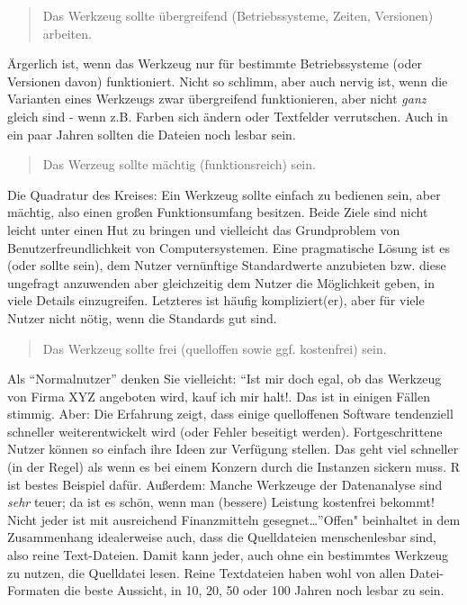\documentclass[12pt,]{book}
\begin{document}
\begin{quote}
Das Werkzeug sollte übergreifend (Betriebssysteme, Zeiten, Versionen)
arbeiten.
\end{quote}

Ärgerlich ist, wenn das Werkzeug nur für bestimmte Betriebssysteme (oder
Versionen davon) funktioniert. Nicht so schlimm, aber auch nervig ist,
wenn die Varianten eines Werkzeugs zwar übergreifend funktionieren, aber
nicht \emph{ganz} gleich sind - wenn z.B. Farben sich ändern oder
Textfelder verrutschen. Auch in ein paar Jahren sollten die Dateien noch
lesbar sein.

\begin{quote}
Das Werzeug sollte mächtig (funktionsreich) sein.
\end{quote}

Die Quadratur des Kreises: Ein Werkzeug sollte einfach zu bedienen sein,
aber mächtig, also einen großen Funktionsumfang besitzen. Beide Ziele
sind nicht leicht unter einen Hut zu bringen und vielleicht das
Grundproblem von Benutzerfreundlichkeit von Computersystemen. Eine
pragmatische Lösung ist es (oder sollte sein), dem Nutzer vernünftige
Standardwerte anzubieten bzw. diese ungefragt anzuwenden aber
gleichzeitig dem Nutzer die Möglichkeit geben, in viele Details
einzugreifen. Letzteres ist häufig kompliziert(er), aber für viele
Nutzer nicht nötig, wenn die Standards gut sind.

\begin{quote}
Das Werkzeug sollte frei (quelloffen sowie ggf. kostenfrei) sein.
\end{quote}

Als ``Normalnutzer'' denken Sie vielleicht: ``Ist mir doch egal, ob das
Werkzeug von Firma XYZ angeboten wird, kauf ich mir halt!. Das ist in
einigen Fällen stimmig. Aber: Die Erfahrung zeigt, dass einige
quelloffenen Software tendenziell schneller weiterentwickelt wird (oder
Fehler beseitigt werden). Fortgeschrittene Nutzer können so einfach ihre
Ideen zur Verfügung stellen. Das geht viel schneller (in der Regel) als
wenn es bei einem Konzern durch die Instanzen sickern muss. R ist bestes
Beispiel dafür. Außerdem: Manche Werkzeuge der Datenanalyse sind
\emph{sehr} teuer; da ist es schön, wenn man (bessere) Leistung
kostenfrei bekommt! Nicht jeder ist mit ausreichend Finanzmitteln
gesegnet\ldots{}''Offen" beinhaltet in dem Zusammenhang idealerweise
auch, dass die Quelldateien menschenlesbar sind, also reine
Text-Dateien. Damit kann jeder, auch ohne ein bestimmtes Werkzeug zu
nutzen, die Quelldatei lesen. Reine Textdateien haben wohl von allen
Datei-Formaten die beste Aussicht, in 10, 20, 50 oder 100 Jahren noch
lesbar zu sein.
\end{document}
